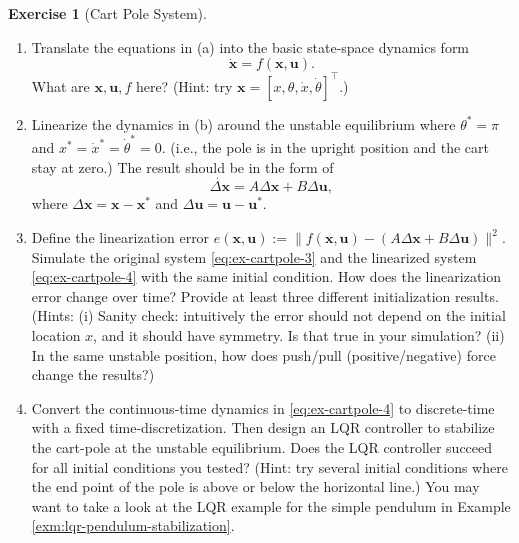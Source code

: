 \documentclass[
]{book}
\theoremstyle{definition}
\theoremstyle{definition}
\theoremstyle{definition}
\newtheorem{exercise}{Exercise}[chapter]
\theoremstyle{definition}
\theoremstyle{remark}
\begin{document}
\begin{exercise}[Cart Pole System]
\begin{enumerate}
\def\labelenumi{\alph{enumi}.}
\setcounter{enumi}{1}
\item
  Translate the equations in (a) into the basic state-space dynamics form
  \begin{equation}
  \dot{\mathbf{x}}=f(\mathbf{x}, \mathbf{u}).
  \label{eq:ex-cartpole-3}
  \end{equation}
  What are \(\mathbf{x},\mathbf{u},f\) here?
  (Hint: try \(\mathbf{x}=[x,\theta,\dot{x},\dot{\theta}]^\top\).)
\item
  Linearize the dynamics in (b) around the unstable equilibrium where \(\theta^*=\pi\) and \(x^*=\dot{x}^*=\dot{\theta}^*=0.\) (i.e., the pole is in the upright position and the cart stay at zero.) The result should be in the form of
  \begin{equation}
  \dot{\Delta\mathbf{x}}=A\Delta\mathbf{x}+B\Delta\mathbf{u},
  \label{eq:ex-cartpole-4}
  \end{equation}
  where \(\Delta\mathbf{x} = \mathbf{x}-\mathbf{x}^*\) and \(\Delta\mathbf{u}=\mathbf{u}-\mathbf{u}^*\).
\item
  Define the linearization error \(e(\mathbf{x}, \mathbf{u}):=\|f(\mathbf{x}, \mathbf{u}) - (A\Delta\mathbf{x}+B\Delta\mathbf{u})\|^2\). Simulate the original system \eqref{eq:ex-cartpole-3} and the linearized system \eqref{eq:ex-cartpole-4} with the same initial condition. How does the linearization error change over time? Provide at least three different initialization results.
  (Hints: (i) Sanity check: intuitively the error should not depend on the initial location \(x\), and it should have symmetry. Is that true in your simulation? (ii) In the same unstable position, how does push/pull (positive/negative) force change the results?)
\item
  Convert the continuous-time dynamics in \eqref{eq:ex-cartpole-4} to discrete-time with a fixed time-discretization. Then design an LQR controller to stabilize the cart-pole at the unstable equilibrium. Does the LQR controller succeed for all initial conditions you tested? (Hint: try several initial conditions where the end point of the pole is above or below the horizontal line.) You may want to take a look at the LQR example for the simple pendulum in Example \ref{exm:lqr-pendulum-stabilization}.
\end{enumerate}

\end{exercise}

~
\end{document}
